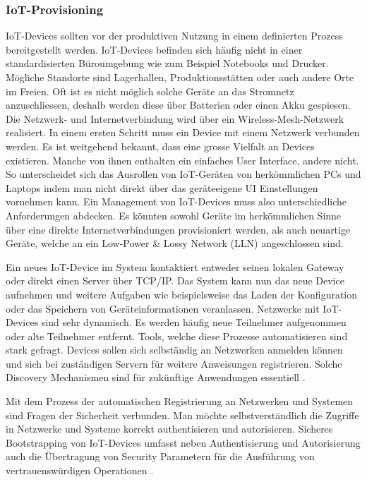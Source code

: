 \subsubsection{IoT-Provisioning} IoT-Devices sollten vor der produktiven Nutzung in einem definierten Prozess bereitgestellt werden. IoT-Devices befinden sich häufig nicht in einer standardisierten Büroumgebung wie zum Beispiel Notebooks und Drucker. Mögliche Standorte sind Lagerhallen, Produktionsstätten oder auch andere Orte im Freien. Oft ist es nicht möglich solche Geräte an das Stromnetz anzuschliessen, deshalb werden diese über Batterien oder einen Akku gespiesen. Die Netzwerk- und Internetverbindung wird über ein Wireless-Mesh-Netzwerk realisiert. In einem ersten Schritt muss ein Device mit einem Netzwerk verbunden werden. Es ist weitgehend bekannt, dass eine grosse Vielfalt an Devices existieren. Manche von ihnen enthalten ein einfaches User Interface, andere nicht. So unterscheidet sich das Ausrollen von IoT-Geräten von herkömmlichen PCs und Laptops indem man nicht direkt über das geräteeigene UI Einstellungen vornehmen kann. Ein Management von IoT-Devices muss also unterschiedliche Anforderungen abdecken. Es könnten sowohl Geräte im herkömmlichen Sinne über eine direkte Internetverbindungen provisioniert werden, als auch neuartige Geräte, welche an ein Low-Power \& Lossy Network (LLN) angeschlossen sind.     

Ein neues IoT-Device im System kontaktiert entweder seinen lokalen Gateway oder direkt einen Server über TCP/IP. Das System kann nun das neue Device aufnehmen und weitere Aufgaben wie beispielsweise das Laden der Konfiguration oder das Speichern von Geräteinformationen veranlassen. Netzwerke mit IoT-Devices sind sehr dynamisch. Es werden häufig neue Teilnehmer aufgenommen oder alte Teilnehmer entfernt. Tools, welche diese Prozesse automatisieren sind stark gefragt. Devices sollen sich selbständig an Netzwerken anmelden können und sich bei zuständigen Servern für weitere Anweisungen registrieren. Solche Discovery Mechanismen sind für zukünftige Anwendungen essentiell \cite{IoTDiscovery10}.

Mit dem Prozess der automatischen Registrierung an Netzwerken und Systemen sind Fragen der Sicherheit verbunden. Man möchte selbstverständlich die Zugriffe in Netzwerke und Systeme korrekt authentisieren und autorisieren. Sicheres Bootstrapping von IoT-Devices umfasst neben Authentisierung und Autorisierung auch die Übertragung von Security Parametern für die Ausführung von vertrauenswürdigen Operationen \cite{IoTSecurityChallenges}.
